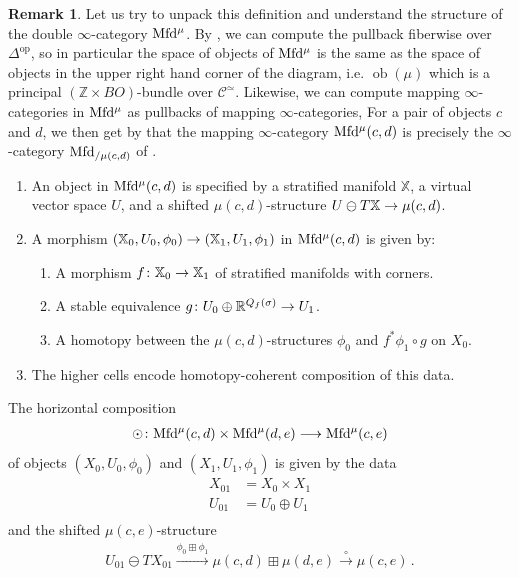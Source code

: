 \documentclass[10pt]{amsart}
\numberwithin{equation}{section}
\theoremstyle{definition}
\newtheorem{rem}[prop]{Remark}
\DeclareMathOperator{\ob}{ob}
\DeclareMathOperator{\op}{op}
\newcommand{\Mfd}{\mathrm{Mfd}\vphantom{d}}
\newcommand{\bZ}{\mathbb{Z}}
\newcommand{\bR}{\mathbb{R}}
\newcommand{\bX}{\mathbb{X}}
\newcommand{\Simp}{\mathbb{\Delta}}
\newcommand{\cC}{\mathcal{C}}
\renewcommand{\to}{\mathchoice{\longrightarrow}{\rightarrow}{}{}}
\begin{document}
\begin{rem}\label{rem:unwinding_Mfd_mu}
	Let us try to unpack this definition and understand the structure of the double $\infty$-category $\Mfd^{\mu}$.
	By , we can compute the pullback fiberwise over $\Simp^{\op}$, so in particular the space of objects of $\Mfd^{\mu}$ is the same as the space of objects in the upper right hand corner of the diagram, i.e. $\ob(\mu)$ which is a principal $(\bZ\times BO)$-bundle over $\cC^{\simeq}$.
	Likewise, we can compute mapping $\infty$-categories in $\Mfd^{\mu}$ as pullbacks of mapping $\infty$-categories,
	For a pair of objects $c$ and $d$, we then get by  that the mapping $\infty$-category $\Mfd^{\mu}(c,d)$ is precisely the $\infty$-category $\Mfd_{/\mu(c,d)}$ of .

	\begin{enumerate}
		\item An object in $\Mfd^{\mu}(c,d)$ is specified by a stratified manifold $\bX$, a virtual vector space $U$, and a shifted $\mu(c,d)$-structure $U\ominus T\bX \to \mu(c,d)$.

		\item  A morphism $(\bX_0,U_0, \phi_{0}) \to (\bX_1,U_1, \phi_{1})$ in $\Mfd^{\mu}(c,d)$ is given by:
		\begin{enumerate}
			\item A morphism $f\colon \bX_0 \to \bX_1$ of stratified manifolds with corners.
			\item A stable equivalence $g\colon U_0\oplus \bR^{Q_f(\sigma)} \to U_1$.
			\item A homotopy between the $\mu(c,d)$-structures $\phi_{0}$ and $f^{*}\phi_{1} \circ g$ on $X_{0}$.
		\end{enumerate}
		\item The higher cells encode homotopy-coherent composition of this data.
	\end{enumerate}
	The horizontal composition
	\begin{align*}
		\odot\colon \Mfd^{\mu}(c,d)\times \Mfd^{\mu}(d,e) \to \Mfd^{\mu}(c,e)
	\end{align*}
	of objects $(X_0,U_0,\phi_0)$ and $(X_1,U_1,\phi_{1})$ is given by the data
	\begin{align*}
		X_{01} &= X_0\times X_1 \\
		U_{01} &= U_0 \oplus U_1 \\
	\end{align*}
	and the shifted $\mu(c,e)$-structure
	\begin{align*}
		U_{01}\ominus TX_{01} \xrightarrow{\phi_{0}\boxplus \phi_{1}} \mu(c,d)\boxplus\mu(d,e) \xrightarrow{\circ} \mu(c,e) \,.
	\end{align*}
\end{rem}
\end{document}
